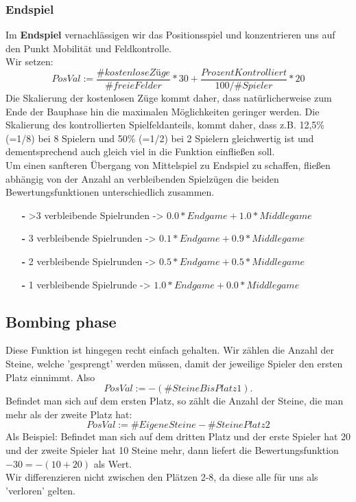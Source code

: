 \subsubsection{Endspiel}
Im \textbf{Endspiel} vernachlässigen wir das Positionsspiel und konzentrieren uns auf den Punkt Mobilität und Feldkontrolle.\\
Wir setzen:$$PosVal := \dfrac{\#kostenloseZüge}{\#freieFelder} * 30 + \dfrac{ProzentKontrolliert}{100/\#Spieler} * 20$$
Die Skalierung der kostenlosen Züge kommt daher, dass natürlicherweise zum Ende der Bauphase hin die maximalen Möglichkeiten geringer werden. Die Skalierung des kontrollierten Spielfeldanteils, kommt daher, dass z.B. 12,5\% (=1/8) bei 8 Spielern und 50\% (=1/2) bei 2 Spielern gleichwertig ist und dementsprechend auch gleich viel in die Funktion einfließen soll.\\
Um einen sanfteren Übergang von Mittelspiel zu Endspiel zu schaffen, fließen abhängig von der Anzahl an verbleibenden Spielzügen die beiden Bewertungsfunktionen unterschiedlich zusammen.
\begin{enumerate}
\item[\textbf{-}] >3 verbleibende Spielrunden -> $0.0*Endgame + 1.0*Middlegame$
\item[\textbf{-}] 3 verbleibende Spielrunden -> $0.1*Endgame + 0.9*Middlegame$
\item[\textbf{-}] 2 verbleibende Spielrunden -> $0.5*Endgame + 0.5*Middlegame$
\item[\textbf{-}] 1 verbleibende Spielrunde -> $1.0*Endgame + 0.0*Middlegame$
\end{enumerate}

\subsection{Bombing phase}
Diese Funktion ist hingegen recht einfach gehalten. Wir zählen die Anzahl der Steine, welche 'gesprengt' werden müssen, damit der jeweilige Spieler den ersten Platz einnimmt. Also 
$$PosVal := -(\#SteineBisPlatz1).$$Befindet man sich auf dem ersten Platz, so zählt die Anzahl der Steine, die man mehr als der zweite Platz hat:
$$PosVal := \#EigeneSteine - \#SteinePlatz2$$
Als Beispiel: Befindet man sich auf dem dritten Platz und der erste Spieler hat 20 und der zweite Spieler hat 10 Steine mehr, dann liefert die Bewertungsfunktion $-30=-(10+20)$ als Wert.\\
Wir differenzieren nicht zwischen den Plätzen 2-8, da diese alle für uns als 'verloren' gelten.